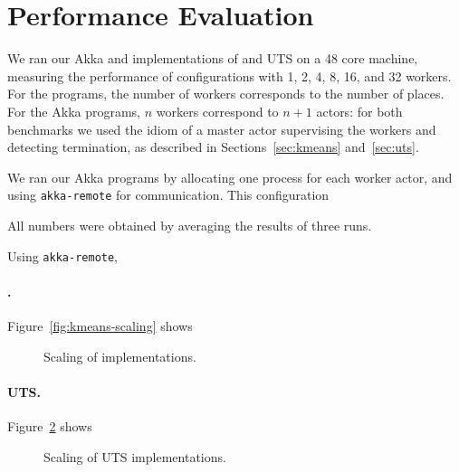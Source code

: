 \section{Performance Evaluation}
\label{sec:perf}

We ran our Akka and \apgas implementations of \kmeans and UTS on a 48 core
machine, measuring the performance of configurations with 1, 2, 4, 8, 16, and
32 workers. For the \apgas programs, the number of workers corresponds to the
number of places. For the Akka programs, $n$ workers correspond to $n+1$
actors: for both benchmarks we used the idiom of a master actor supervising the
workers and detecting termination, as described in Sections~\ref{sec:kmeans}
and~\ref{sec:uts}.

We ran our Akka programs by allocating one process for each worker actor, and
using \lstinline{akka-remote} for communication. This configuration \TODO

All numbers were obtained by averaging the results of three runs.

Using \lstinline{akka-remote},
\TODO

\paragraph{\kmeans.} Figure~\ref{fig:kmeans-scaling} shows \TODO

\begin{figure}
\vspace{-0.3cm}
\hspace{-0.2cm}
\begingroup\graphicspath{{figures/}}\endgroup
\vspace{-0.2cm}
\caption{Scaling of \kmeans implementations.}
\label{fig:uts-scaling}
\end{figure}

\paragraph{UTS.} Figure~\ref{fig:uts-scaling} shows \TODO

\begin{figure}
\vspace{-0.3cm}
\hspace{-0.2cm}
\begingroup\graphicspath{{figures/}}\endgroup
\vspace{-0.2cm}
\caption{Scaling of UTS implementations.}
\label{fig:uts-scaling}
\end{figure}


